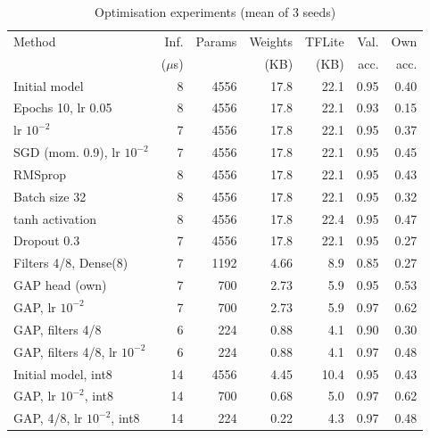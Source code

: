 \documentclass[conference]{IEEEtran}
\begin{document}
\begin{table}[t]
\caption{Optimisation experiments (mean of 3 seeds)}
\label{tab:opt}
\centering
\footnotesize
\setlength{\tabcolsep}{3pt}
\begin{tabular}{lrrrrrr}
\toprule
Method & Inf. & Params & Weights & TFLite & Val. & Own \\
       & ($\mu$s) &    & (KB)    & (KB)   & acc. & acc. \\
\midrule
Initial model                  & 8  & 4556 & 17.8 & 22.1 & 0.95 & 0.40 \\
Epochs 10, lr 0.05             & 8  & 4556 & 17.8 & 22.1 & 0.93 & 0.15 \\
lr $10^{-2}$                   & 7  & 4556 & 17.8 & 22.1 & 0.95 & 0.37 \\
SGD (mom. 0.9), lr $10^{-2}$   & 7  & 4556 & 17.8 & 22.1 & 0.95 & 0.45 \\
RMSprop                        & 8  & 4556 & 17.8 & 22.1 & 0.95 & 0.43 \\
Batch size 32                  & 8  & 4556 & 17.8 & 22.1 & 0.95 & 0.32 \\
tanh activation                & 8  & 4556 & 17.8 & 22.4 & 0.95 & 0.47 \\
Dropout 0.3                    & 7  & 4556 & 17.8 & 22.1 & 0.95 & 0.27 \\
Filters 4/8, Dense(8)          & 7  & 1192 & 4.66 & 8.9  & 0.85 & 0.27 \\
\midrule
GAP head (own)                 & 7  & 700  & 2.73 & 5.9  & 0.95 & 0.53 \\
GAP, lr $10^{-2}$              & 7  & 700  & 2.73 & 5.9  & 0.97 & 0.62 \\
GAP, filters 4/8               & 6  & 224  & 0.88 & 4.1  & 0.90 & 0.30 \\
GAP, filters 4/8, lr $10^{-2}$ & 6  & 224  & 0.88 & 4.1  & 0.97 & 0.48 \\
\midrule
Initial model, int8            & 14 & 4556 & 4.45 & 10.4 & 0.95 & 0.43 \\
GAP, lr $10^{-2}$, int8        & 14 & 700  & 0.68 & 5.0  & 0.97 & 0.62 \\
GAP, 4/8, lr $10^{-2}$, int8   & 14 & 224  & 0.22 & 4.3  & 0.97 & 0.48 \\
\bottomrule
\end{tabular}
\end{table}
\end{document}
